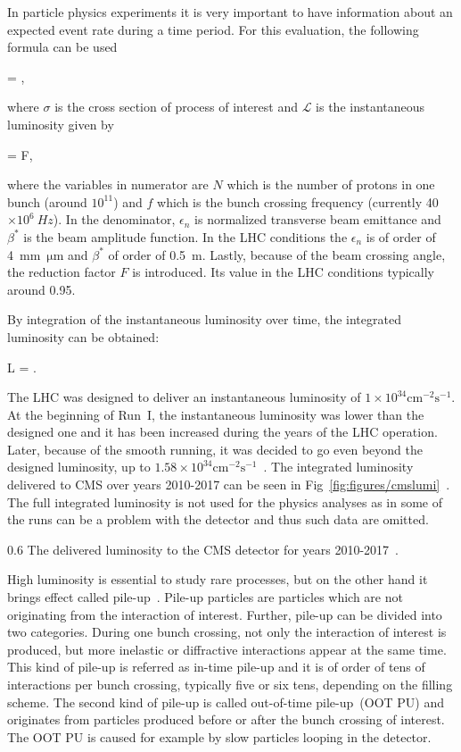 In particle physics experiments it is very important to have information about an expected event rate during a time period. For this evaluation, the following formula can be used

{
  = \sigma \times {},
}

where $\sigma$ is the cross section of process of interest and $\mathcal{L}$ is the instantaneous luminosity given by

{
  = F,
}

where the variables in numerator are $N$ which is the number of protons in one bunch (around $10^{11}$) and $f$ which is the bunch crossing frequency (currently 40$\times 10^{6}~Hz$). In the denominator, $\epsilon_{n}$ is normalized transverse beam emittance and $\beta^{*}$ is the beam amplitude function. In the LHC conditions the  $\epsilon_{n}$ is of order of 4~mm~$\mathrm{\mu m}$ and $\beta^{*}$ of order of 0.5~m. Lastly, because of the beam crossing angle, the reduction factor $F$ is introduced. Its value in the LHC conditions typically around 0.95.

By integration of the instantaneous luminosity over time, the integrated luminosity can be obtained:

{
 L = .
}

The LHC was designed to deliver an instantaneous luminosity of $1 \times 10^{34} \mathrm{cm^{-2}s^{-1}}$. At the beginning of Run~I, the instantaneous luminosity was lower than the designed one and it has been increased during the years of the LHC operation. Later, because of the smooth running, it was decided to go even beyond the designed luminosity, up to $1.58 \times 10^{34} \mathrm{cm^{-2}s^{-1}}$~\cite{Pralavorio:2272474}. The integrated luminosity delivered to CMS over years 2010-2017 can be seen in Fig~\ref{fig:figures/cmslumi}~\cite{website:CMSlumi}. The full integrated luminosity is not used for the physics analyses as in some of the runs can be a problem with the detector and thus such data are omitted.

                 {0.6}       %
                 { The delivered luminosity to the CMS detector for years 2010-2017~\cite{website:CMSlumi}. }


High luminosity is essential to study rare processes, but on the other hand it brings effect called pile-up~\cite{Bayatian:2006nff}. Pile-up particles are particles which are not originating from the interaction of interest. Further, pile-up can be divided into two categories. During one bunch crossing, not only the interaction of interest is produced, but more inelastic or diffractive interactions appear at the same time. This kind of pile-up is referred as in-time pile-up and it is of order of tens of interactions per bunch crossing, typically five or six tens, depending on the filling scheme. The second kind of pile-up is called out-of-time pile-up~(OOT PU) and originates from particles produced before or after the bunch crossing of interest. The OOT PU is caused for example by slow particles looping in the detector.

